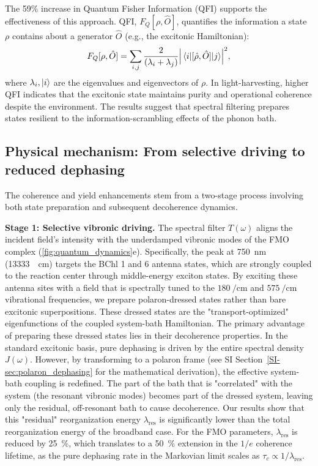\documentclass[journal=jpcl,manuscript=letter]{achemso}
\begin{document}
The 59\% increase in Quantum Fisher Information (QFI) supports the effectiveness of this approach. QFI, $F_Q[\rho, \hat{O}]$, quantifies the information a state $\rho$ contains about a generator $\hat{O}$ (e.g., the excitonic Hamiltonian):
\begin{equation}
F_Q[\rho, \hat{O}] = \sum_{i,j} \frac{2}{(\lambda_i + \lambda_j)} \abs{\mel{i}{[\hat{\rho}, \hat{O}]}{j}}^2,
\label{eq:QFI}
\end{equation}
where $\lambda_i, \ket{i}$ are the eigenvalues and eigenvectors of $\rho$. In light-harvesting, higher QFI indicates that the excitonic state maintains purity and operational coherence despite the environment.\cite{Pezze2009} The results suggest that spectral filtering prepares states resilient to the information-scrambling effects of the phonon bath.

\subsection{Physical mechanism: From selective driving to reduced dephasing}

The coherence and yield enhancements stem from a two-stage process involving both state preparation and subsequent decoherence dynamics. 

\textbf{Stage 1: Selective vibronic driving.} The spectral filter $T(\omega)$ aligns the incident field's intensity with the underdamped vibronic modes of the FMO complex (\cref{fig:quantum_dynamics}e). Specifically, the peak at \SI{750}{\nano\meter} (\SI{13333}{\per\centi\meter}) targets the BChl 1 and 6 antenna states, which are strongly coupled to the reaction center through middle-energy exciton states. By exciting these antenna sites with a field that is spectrally tuned to the $\SI{180}{\per\centi\meter}$ and $\SI{575}{\per\centi\meter}$ vibrational frequencies, we prepare polaron-dressed states rather than bare excitonic superpositions. These dressed states are the "transport-optimized" eigenfunctions of the coupled system-bath Hamiltonian.\cite{Chin2013} The primary advantage of preparing these dressed states lies in their decoherence properties. In the standard excitonic basis, pure dephasing is driven by the entire spectral density $J(\omega)$. However, by transforming to a polaron frame (see SI Section~\ref{SI-sec:polaron_dephasing} for the mathematical derivation), the effective system-bath coupling is redefined. The part of the bath that is "correlated" with the system (the resonant vibronic modes) becomes part of the dressed system, leaving only the residual, off-resonant bath to cause decoherence. Our results show that this "residual" reorganization energy $\lambda_{\mathrm{res}}$ is significantly lower than the total reorganization energy of the broadband case. For the FMO parameters, $\lambda_{\mathrm{res}}$ is reduced by \SI{25}{\percent}, which translates to a \SI{50}{\percent} extension in the $1/e$ coherence lifetime, as the pure dephasing rate in the Markovian limit scales as $\tau_c \propto 1/\lambda_{\mathrm{res}}$.
\end{document}
